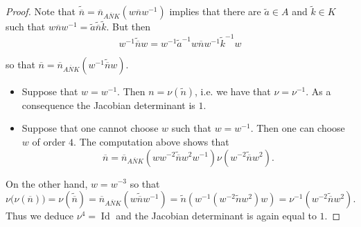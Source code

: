 \documentclass[10pt]{amsart}
\theoremstyle{definition}
\DeclareMathOperator{\Id}{Id}
\newcommand{\til}{\widetilde}
\newcommand{\bn}{{\overline{n}}}
\newcommand{\bN}{{\overline{N}}}
\begin{document}
\begin{proof}
Note that $\til \bn=\bn_{A\bN K}(w\bn w^{-1}) $ implies that there are $\til a\in A$ and $\til k\in K$ such that $w\bn w^{-1}=\til a\til \bn\til k$. But then
\[
w^{-1}\til \bn w =w^{-1}\til a^{-1}w \bn w^{-1} \til k^{-1}w
\]

so that $\bn=\bn_{A\bN K}(w^{-1}\til \bn w)$.


\begin{itemize}
\item[Case 1] Suppose that $w=w^{-1}$. Then $n=\nu(\til n)$, i.e. we have that $\nu=\nu^{-1}$. As a consequence the Jacobian determinant is $1$.
\item[Case 2] Suppose that one cannot choose $w$ such that $w=w^{-1}$. Then one can choose $w$ of order $4$. The computation above shows that
\[
\bn=\bn_{A\bN K}\left(ww^{-2}\til \bn w^2 w^ {-1}\right) \nu\left(w^{-2}\til \bn w^2\right).
\]
\end{itemize}

On the other hand, $w=w^{-3}$ so that
\[
\nu\big(\nu(\bn)\big)=\nu\left(\til \bn\right)= \bn_{A\bN K}\left(w \til \bn w^{-1}\right)= \til n\left(w^{-1}\left(w^{-2}\til n w^2\right) w\right)= \nu^ {-1}\left(w^{-2}\til \bn w^2\right).
\]
Thus we deduce $\nu^4 =\Id$ and the Jacobian determinant is again equal to $1$.
\end{proof}\let\qed\relax
\end{document}
